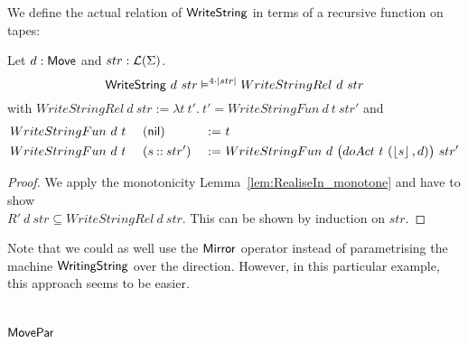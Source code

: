 We define the actual relation of $\mathsf{WriteString}$ in terms of a recursive function on tapes:
\begin{lemma}
  \label{lem:WriteString_Sem}
  Let $d:\mathsf{Move}$ and $str:\mathcal{L}(\Sigma)$.
  \[ \mathsf{WriteString}~d~str \vDash^{4\cdot\left| str \right|} WriteStringRel~d~str \]
  with
  $WriteStringRel~d~str := \lambda t~t'.~t' = WriteStringFun~d~t~str'$ and
  \begin{alignat*}{3}
    &WriteStringFun~d~t~&&(\mathsf{nil}        ) &~:=~& t \\
    &WriteStringFun~d~t~&&(s \mathbin{::} str') &~:=~& WriteStringFun~d~\bigl(doAct~t~(\left\lfloor {s} \right\rfloor, d)\bigr)~str'
  \end{alignat*}
\end{lemma}
\begin{proof}
  We apply the monotonicity Lemma~\ref{lem:RealiseIn_monotone} and have to show\\
  $R'~d~str \subseteq WriteStringRel~d~str$.  This can be shown by induction on $str$.
\end{proof}

Note that we could as well use the $\mathsf{Mirror}$ operator instead of parametrising the machine $\mathsf{WritingString}$ over the direction.  However, in
this particular example, this approach seems to be easier.

\section{$\mathsf{MovePar}$}
\label{sec:MovePar}

